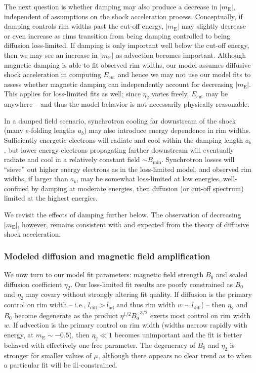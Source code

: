 \documentclass[iop, apj, numberedappendix]{emulateapj}
\newcommand*{\mt}{\mathrm}
\newcommand*{\abt}{\mathord{\sim}} %
\newcommand*{\mE}{m_\mt{E}}
\newcommand*{\Ecut}{E_{\mt{cut}}}
\newcommand*{\Bmin}{B_{\mt{min}}}
\begin{document}
The next question is whether damping may also produce a decrease in $|\mE|$,
independent of assumptions on the shock acceleration process.  Conceptually, if
damping controls rim widths past the cut-off energy, $|\mE|$ may slightly
decrease or even increase as rims transition from being damping controlled to
being diffusion loss-limited.  If damping is only important well below the
cut-off energy, then we may see an increase in $|\mE|$ as advection becomes
important.  Although magnetic damping is able to fit observed rim widths, our
model assumes diffusive shock acceleration in computing $\Ecut$ and hence we
may not use our model fits to assess whether magnetic damping can independently
account for decreasing $|\mE|$.  This applies for loss-limited fits as well;
since $\eta_2$ varies freely, $\Ecut$ may be anywhere -- and thus the model
behavior is not necessarily physically reasonable.

In a damped field scenario, synchrotron cooling far downstream of the shock
(many $e$-folding lengths $a_b$) may also introduce energy dependence in rim
widths.  Sufficiently energetic electrons will radiate and cool within the
damping length $a_b$, but lower energy electrons propagating farther downstream
will eventually radiate and cool in a relatively constant field $\abt \Bmin$.
Synchrotron losses will ``sieve'' out higher energy electrons as in the
loss-limited model, and observed rim widths, if larger than $a_b$, may be
somewhat loss-limited at low energies, well-confined by damping at moderate
energies, then diffusion (or cut-off spectrum) limited at the highest energies.

We revisit the effects of damping further below.  The observation of decreasing
$|\mE|$, however, remains consistent with and expected from the theory of
diffusive shock acceleration.

\subsubsection{Modeled diffusion and magnetic field amplification}

We now turn to our model fit parameters: magnetic field strength $B_0$ and
scaled diffusion coefficient $\eta_2$.  Our loss-limited fit results are poorly
constrained as $B_0$ and $\eta_2$ may covary without strongly altering fit
quality.  If diffusion is the primary control on rim width -- i.e.,
$l_{\mt{diff}} > l_{\mt{ad}}$ and thus rim width $w \sim l_{\mt{diff}}$) --
then $\eta_2$ and $B_0$ become degenerate as the product $\eta^{1/2}
B_0^{-3/2}$ exerts most control on rim width $w$.  If advection is the primary
control on rim width (widths narrow rapidly with energy, at $\mE \sim -0.5$),
then $\eta_2 \ll 1$ becomes unimportant and the fit is better behaved with
effectively one free parameter.  The degeneracy of $B_0$ and $\eta_2$ is
stronger for smaller values of $\mu$, although there appears no clear trend as
to when a particular fit will be ill-constrained.
\end{document}
